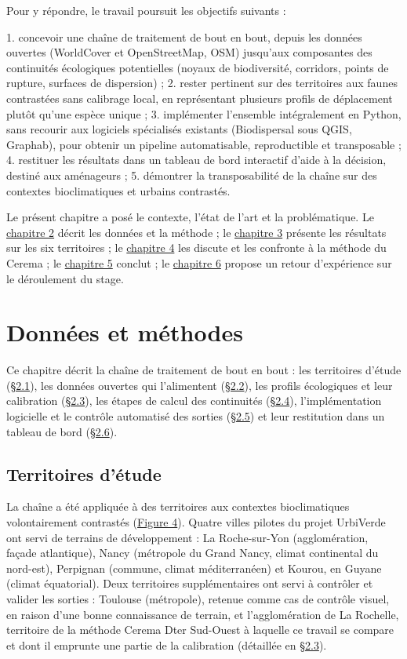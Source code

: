 \documentclass[a4paper,11pt]{report}
\begin{document}
Pour y répondre, le travail poursuit les objectifs suivants :

1. concevoir une chaîne de traitement de bout en bout, depuis les données ouvertes (WorldCover et OpenStreetMap, OSM) jusqu'aux composantes des continuités écologiques potentielles (noyaux de biodiversité, corridors, points de rupture, surfaces de dispersion) ; 2. rester pertinent sur des territoires aux faunes contrastées sans calibrage local, en représentant plusieurs profils de déplacement plutôt qu'une espèce unique ; 3. implémenter l'ensemble intégralement en Python, sans recourir aux logiciels spécialisés existants (Biodispersal sous QGIS, Graphab), pour obtenir un pipeline automatisable, reproductible et transposable ; 4. restituer les résultats dans un tableau de bord interactif d'aide à la décision, destiné aux aménageurs ; 5. démontrer la transposabilité de la chaîne sur des contextes bioclimatiques et urbains contrastés.

Le présent chapitre a posé le contexte, l'état de l'art et la problématique. Le \hyperref[chap:2]{chapitre 2} décrit les données et la méthode ; le \hyperref[chap:3]{chapitre 3} présente les résultats sur les six territoires ; le \hyperref[chap:4]{chapitre 4} les discute et les confronte à la méthode du Cerema ; le \hyperref[chap:5]{chapitre 5} conclut ; le \hyperref[chap:6]{chapitre 6} propose un retour d'expérience sur le déroulement du stage.

\chapter{Données et méthodes}\label{chap:2}

Ce chapitre décrit la chaîne de traitement de bout en bout : les territoires d'étude (\hyperref[sec:2.1]{§2.1}), les données ouvertes qui l'alimentent (\hyperref[sec:2.2]{§2.2}), les profils écologiques et leur calibration (\hyperref[sec:2.3]{§2.3}), les étapes de calcul des continuités (\hyperref[sec:2.4]{§2.4}), l'implémentation logicielle et le contrôle automatisé des sorties (\hyperref[sec:2.5]{§2.5}) et leur restitution dans un tableau de bord (\hyperref[sec:2.6]{§2.6}).

\section{Territoires d'étude}\label{sec:2.1}

La chaîne a été appliquée à des territoires aux contextes bioclimatiques volontairement contrastés (\hyperref[fig:4]{Figure 4}). Quatre villes pilotes du projet UrbiVerde ont servi de terrains de développement : La Roche-sur-Yon (agglomération, façade atlantique), Nancy (métropole du Grand Nancy, climat continental du nord-est), Perpignan (commune, climat méditerranéen) et Kourou, en Guyane (climat équatorial). Deux territoires supplémentaires ont servi à contrôler et valider les sorties : Toulouse (métropole), retenue comme cas de contrôle visuel, en raison d'une bonne connaissance de terrain, et l'agglomération de La Rochelle, territoire de la méthode Cerema Dter Sud-Ouest à laquelle ce travail se compare et dont il emprunte une partie de la calibration (détaillée en \hyperref[sec:2.3]{§2.3}).
\end{document}
